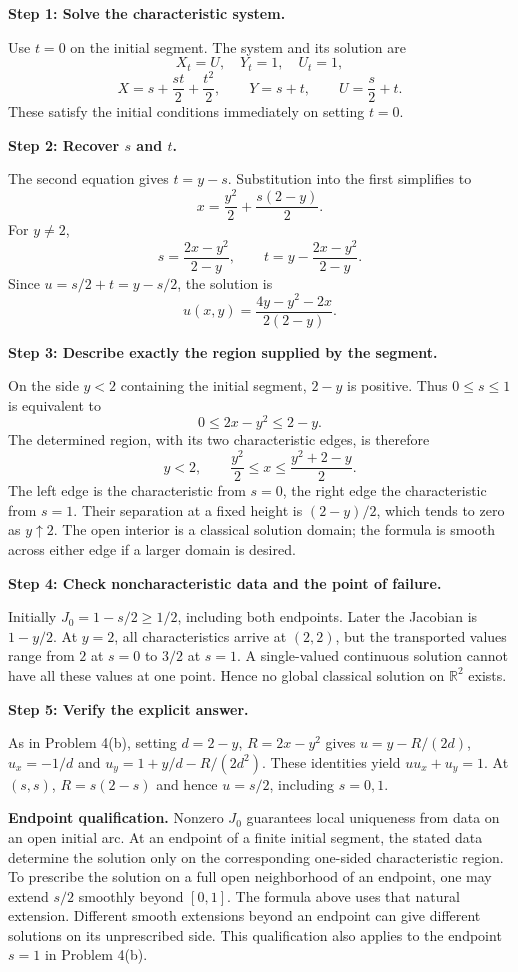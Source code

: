 \documentclass[11pt,a4paper]{article}
\newcommand{\R}{\mathbb R}
\newcommand{\step}[1]{\par\medskip\textbf{#1}\par}
\newcommand{\answer}[1]{\begin{equation*}\boxed{\displaystyle #1}\end{equation*}}
\begin{document}
\step{Step 1: Solve the characteristic system.}
Use $t=0$ on the initial segment. The system and its solution are
\[
 X_t=U,\quad Y_t=1,\quad U_t=1,
\]
\[
 X=s+\frac{st}{2}+\frac{t^2}{2},\qquad
 Y=s+t,\qquad U=\frac{s}{2}+t.
\]
These satisfy the initial conditions immediately on setting $t=0$.

\step{Step 2: Recover $s$ and $t$.}
The second equation gives $t=y-s$. Substitution into the first simplifies to
\[
 x=\frac{y^2}{2}+\frac{s(2-y)}2.
\]
For $y\ne2$,
\[
 s=\frac{2x-y^2}{2-y},\qquad t=y-\frac{2x-y^2}{2-y}.
\]
Since $u=s/2+t=y-s/2$, the solution is
\answer{u(x,y)=\frac{4y-y^2-2x}{2(2-y)}.}

\step{Step 3: Describe exactly the region supplied by the segment.}
On the side $y<2$ containing the initial segment, $2-y$ is positive. Thus $0\le s\le1$ is equivalent to
\[
 0\le2x-y^2\le2-y.
\]
The determined region, with its two characteristic edges, is therefore
\[
 y<2,\qquad \frac{y^2}{2}\le x\le\frac{y^2+2-y}{2}.
\]
The left edge is the characteristic from $s=0$, the right edge the characteristic from $s=1$. Their separation at a fixed height is $(2-y)/2$, which tends to zero as $y\uparrow2$. The open interior is a classical solution domain; the formula is smooth across either edge if a larger domain is desired.

\step{Step 4: Check noncharacteristic data and the point of failure.}
Initially $J_0=1-s/2\ge1/2$, including both endpoints. Later the Jacobian is $1-y/2$. At $y=2$, all characteristics arrive at $(2,2)$, but the transported values range from $2$ at $s=0$ to $3/2$ at $s=1$. A single-valued continuous solution cannot have all these values at one point. Hence no global classical solution on $\R^2$ exists.

\step{Step 5: Verify the explicit answer.}
As in Problem 4(b), setting $d=2-y$, $R=2x-y^2$ gives $u=y-R/(2d)$, $u_x=-1/d$ and $u_y=1+y/d-R/(2d^2)$. These identities yield $uu_x+u_y=1$. At $(s,s)$, $R=s(2-s)$ and hence $u=s/2$, including $s=0,1$.

\textbf{Endpoint qualification.} Nonzero $J_0$ guarantees local uniqueness from data on an open initial arc. At an endpoint of a finite initial segment, the stated data determine the solution only on the corresponding one-sided characteristic region. To prescribe the solution on a full open neighborhood of an endpoint, one may extend $s/2$ smoothly beyond $[0,1]$. The formula above uses that natural extension. Different smooth extensions beyond an endpoint can give different solutions on its unprescribed side. This qualification also applies to the endpoint $s=1$ in Problem 4(b).
\end{document}
